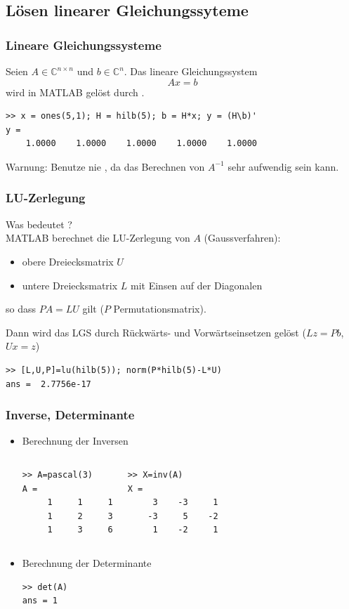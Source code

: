 \documentclass[hyperref={xetex}]{beamer}
\begin{document}
\subsection{Lösen linearer Gleichungssyteme}
% 
%
\begin{frame}[fragile]\frametitle{Lineare Gleichungssysteme}
Seien $A \in \mathbb{C}^{n\times n}$ und $b \in \mathbb{C}^n$. Das
lineare Gleichungssystem 
{ \[ A x=b \]}
wird in MATLAB gelöst durch  .\\

\begin{lstlisting}
>> x = ones(5,1); H = hilb(5); b = H*x; y = (H\b)'
y =
    1.0000    1.0000    1.0000    1.0000    1.0000
\end{lstlisting}

\alert{Warnung:} Benutze nie
, da das Berechnen von $A^{-1}$ sehr aufwendig sein kann.
\end{frame}
% 
%
\begin{frame}[fragile]\frametitle{LU-Zerlegung}
{\centering  Was bedeutet ?}\\[0.5cm]

MATLAB berechnet die LU-Zerlegung von $A$ (Gaussverfahren):
\begin{itemize}
 \item obere Dreiecksmatrix $U$
 \item untere Dreiecksmatrix $L$ mit Einsen auf der Diagonalen
\end{itemize}
so dass $PA=LU$ gilt ($P$ Permutationsmatrix).

Dann wird das LGS durch Rückwärts- und Vorwärtseinsetzen gelöst
($Lz = Pb$, $Ux = z$)

\begin{lstlisting}
>> [L,U,P]=lu(hilb(5)); norm(P*hilb(5)-L*U)
ans =  2.7756e-17
\end{lstlisting}
\end{frame}
% 
%
\begin{frame}[fragile]\frametitle{Inverse,  Determinante}
\begin{itemize}
\item Berechnung der Inversen
\begin{columns}[onlytextwidth]
\begin{lstlisting}
>> A=pascal(3)
A =
     1     1     1
     1     2     3
     1     3     6
\end{lstlisting}
\begin{lstlisting}
>> X=inv(A)
X =
     3    -3     1
    -3     5    -2
     1    -2     1
\end{lstlisting}
\end{columns}
\item Berechnung der Determinante
\begin{lstlisting}
>> det(A)
ans = 1
\end{lstlisting}
\end{itemize}
\end{frame}
\end{document}

